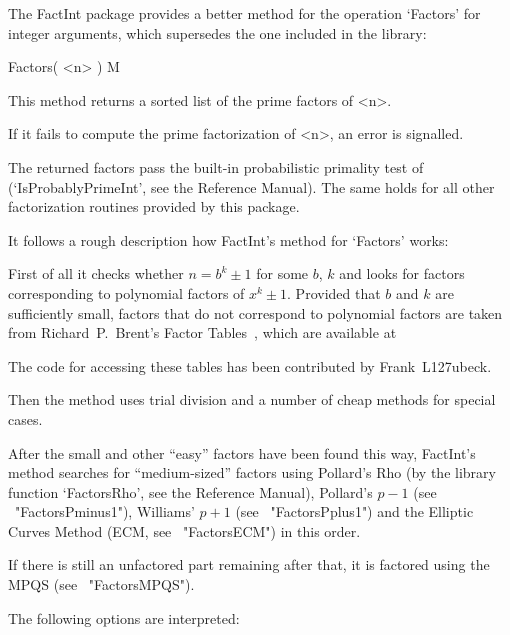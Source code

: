 

The FactInt package provides a better method for the operation `Factors'
for integer arguments, which supersedes the one included in the {\GAP}
library:

\>Factors( <n> ) M

This method returns a sorted list of the prime factors of <n>.

If it fails to compute the prime factorization of <n>, an error is
signalled.

The returned factors pass the built-in probabilistic primality test of
{\GAP} (`IsProbablyPrimeInt', see the {\GAP} Reference Manual).
The same holds for all other factorization routines provided by this
package.

It follows a rough description how FactInt's method for `Factors' works:

First of all it checks whether $n = b^k \pm 1$ for some $b$, $k$ and
looks for factors corresponding to polynomial factors of $x^k \pm 1$.
Provided that $b$ and $k$ are sufficiently small, factors that do not
correspond to polynomial factors are taken from Richard~P.~Brent's
Factor Tables~\cite{Brent04}, which are available at


The code for accessing these tables has been contributed by
Frank~L\accent127ubeck.

Then the method uses trial division and a number of cheap methods for
special cases.

After the small and other ``easy'' factors have been found this way,
FactInt's method searches for ``medium-sized'' factors using Pollard's Rho
(by the library function `FactorsRho', see the {\GAP} Reference Manual),
Pollard's $p-1$ (see ~"FactorsPminus1"), Williams' $p+1$
(see ~"FactorsPplus1") and the Elliptic Curves Method
(ECM, see ~"FactorsECM") in this order.

If there is still an unfactored part remaining after that,
it is factored using the MPQS (see ~"FactorsMPQS").

The following options are interpreted:

